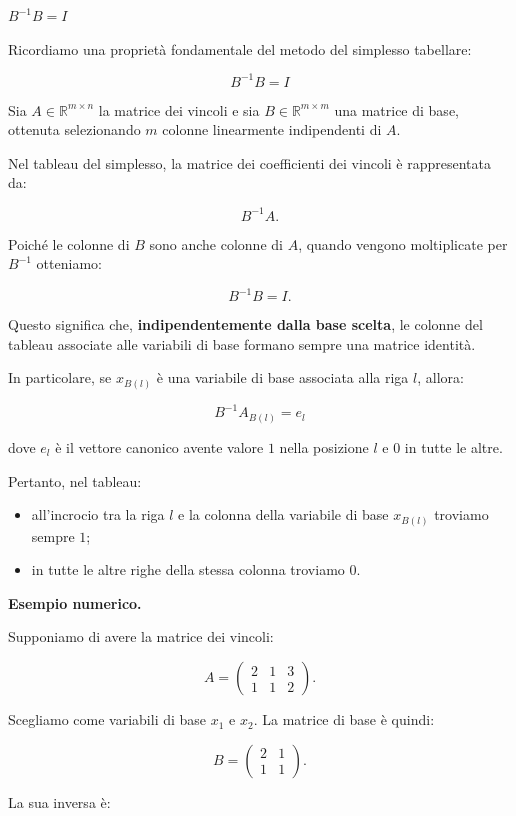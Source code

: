\begin{observation}{$B^{-1}B=I$}

Ricordiamo una proprietà fondamentale del metodo del simplesso tabellare:

\[
\boxed{B^{-1}B=I}
\]

Sia $A \in \mathbb{R}^{m \times n}$ la matrice dei vincoli e sia $B \in \mathbb{R}^{m \times m}$ una matrice di base, ottenuta selezionando $m$ colonne linearmente indipendenti di $A$.

Nel tableau del simplesso, la matrice dei coefficienti dei vincoli è rappresentata da:

\[
B^{-1}A.
\]

Poiché le colonne di $B$ sono anche colonne di $A$, quando vengono moltiplicate per $B^{-1}$ otteniamo:

\[
B^{-1}B=I.
\]

Questo significa che, \textbf{indipendentemente dalla base scelta}, le colonne del tableau associate alle variabili di base formano sempre una matrice identità.

In particolare, se $x_{B(l)}$ è una variabile di base associata alla riga $l$, allora:

\[
\boxed{B^{-1}A_{B(l)}=e_l}
\]

dove $e_l$ è il vettore canonico avente valore $1$ nella posizione $l$ e $0$ in tutte le altre.

Pertanto, nel tableau:
\begin{itemize}
    \item all'incrocio tra la riga $l$ e la colonna della variabile di base $x_{B(l)}$ troviamo sempre $1$;
    \item in tutte le altre righe della stessa colonna troviamo $0$.
\end{itemize}

\textbf{Esempio numerico.}

Supponiamo di avere la matrice dei vincoli:

\[
A=
\begin{pmatrix}
2 & 1 & 3\\
1 & 1 & 2
\end{pmatrix}.
\]

Scegliamo come variabili di base $x_1$ e $x_2$. La matrice di base è quindi:

\[
B=
\begin{pmatrix}
2 & 1\\
1 & 1
\end{pmatrix}.
\]

La sua inversa è:


\end{observation}
